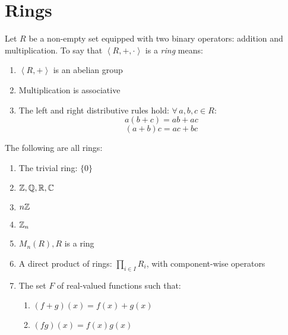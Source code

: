 \documentclass[letterpaper,12pt,fleqn]{article}
\newcommand{\ring}[1]{\left<#1,+,\cdot\right>}
\newcommand{\group}[2]{\left<#1,#2\right>}
\begin{document}
\section*{Rings}

\begin{definition}
  Let $R$ be a non-empty set equipped with two binary operators: addition and
  multiplication. To say that $\ring{R}$ is a \emph{ring} means:
  \begin{enumerate}
  \item $\group{R}{+}$ is an abelian group
  \item Multiplication is associative
  \item The left and right distributive rules hold: $\forall\,a,b,c\in R$:
    \[a(b+c)=ab+ac\]
    \[(a+b)c=ac+bc\]
  \end{enumerate}
\end{definition}

\begin{example}
  The following are all rings:
  \begin{enumerate}
  \item The trivial ring: $\{0\}$
  \item $\mathbb{Z}, \mathbb{Q}, \mathbb{R}, \mathbb{C}$
  \item $n\mathbb{Z}$
  \item $\mathbb{Z}_n$
  \item $M_n(R), R$ is a ring
  \item A direct product of rings: $\prod_{i\in I}R_i$, with component-wise
    operators
  \item The set $F$ of real-valued functions such that:
    \begin{enumerate}
    \item $(f+g)(x)=f(x)+g(x)$
    \item $(fg)(x)=f(x)g(x)$
    \end{enumerate}
  \end{enumerate}
\end{example}
\end{document}
